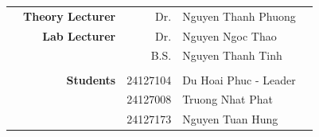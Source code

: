 \begin{titlepage}
\begin{center}
        \begin{table}[H]
            \begin{center}
                \begin{tabular}{rrrlc}
                     & \large{\textbf{Theory Lecturer}} & \large{Dr.} & \large{Nguyen Thanh Phuong}        &                  \\
                     & \large{\textbf{Lab Lecturer}}    & \large{Dr.} &\large{Nguyen Ngoc Thao} &                  \\
                     &                                  & \large{B.S.} & \large{Nguyen Thanh Tinh} &                  \\
                     &                                  &                              &                  \\
                     & \large{\textbf{Students}}        & \large{24127104} & \large{Du Hoai Phuc - Leader}          \\
                     &                                  & \large{24127008} & \large{Truong Nhat Phat}\\
                     &                                  & \large{24127173} & \large{Nguyen Tuan Hung}
                \end{tabular}
            \end{center}
        \end{table}
    \end{center}
	\vspace{3cm}
\end{titlepage}
